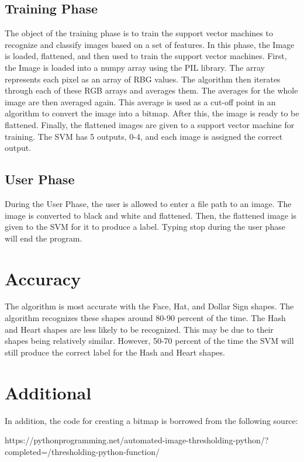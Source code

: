 \documentclass[11pt, oneside]{article}   	%
\begin{document}
\subsection{Training Phase}
	The object of the training phase is to train the support vector machines to recognize and classify images based on a set of features.  In this phase, the Image is loaded, flattened, and then used to train the support vector machines.
	First, the Image is loaded into a numpy array using the PIL library.  The array represents each pixel as an array of RBG values.  The algorithm then iterates through each of these RGB arrays and averages them.  The averages for the whole image are then averaged again.  This average is used as a cut-off point in an algorithm to convert the image into a bitmap.  After this,	the image is ready to be flattened.
	Finally, the flattened images are given to a support vector machine for training.  The SVM has 5 outputs, 0-4, and each image is assigned the correct output.
	
\subsection{User Phase}
	During the User Phase, the user is allowed to enter a file path to an image.  The image is converted to black and white and flattened.  Then, the flattened image is given to the SVM for it to produce a label.  Typing stop during the user phase will end the program.
		
\section{Accuracy}
	The algorithm is most accurate with the Face, Hat, and Dollar Sign shapes.  The algorithm recognizes these shapes around 80-90 percent of the time.  The Hash and Heart shapes are less likely to be recognized.  This may be due to their shapes being relatively similar.  However, 50-70 percent of the time the SVM will still produce the correct label for the Hash and Heart shapes.
	
\section{Additional}
In addition, the code for creating a bitmap is borrowed from the following source:
	
https://pythonprogramming.net/automated-image-thresholding-python/?completed=/thresholding-python-function/
\end{document}
